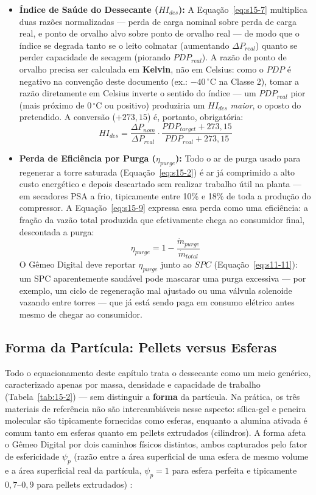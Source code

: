 \documentclass[12pt,a4paper]{article}
\numberwithin{equation}{section}
\numberwithin{table}{section}
\numberwithin{figure}{section}
\begin{document}
{\begin{itemize}
			\item \textbf{Índice de Saúde do Dessecante ($HI_{des}$):} A Equação~\eqref{eq:s15-7} multiplica duas razões normalizadas — perda de carga nominal sobre perda de carga real, e ponto de orvalho alvo sobre ponto de orvalho real — de modo que o índice se degrada tanto se o leito colmatar (aumentando $\Delta P_{real}$) quanto se perder capacidade de secagem (piorando $PDP_{real}$). A razão de ponto de orvalho precisa ser calculada em \textbf{Kelvin}, não em Celsius: como o $PDP$ é negativo na convenção deste documento (ex.: $-40\,^{\circ}$C na Classe 2), tomar a razão diretamente em Celsius inverte o sentido do índice — um $PDP_{real}$ pior (mais próximo de $0\,^{\circ}$C ou positivo) produziria um $HI_{des}$ \textit{maior}, o oposto do pretendido. A conversão ($+273{,}15$) é, portanto, obrigatória:
			\begin{equation}\label{eq:s15-7}
HI_{des} = \frac{\Delta P_{nom}}{\Delta P_{real}} \cdot \frac{PDP_{target} + 273{,}15}{PDP_{real} + 273{,}15}
\end{equation}

			\item \textbf{Perda de Eficiência por Purga ($\eta_{purge}$):} Todo o ar de purga usado para regenerar a torre saturada (Equação~\eqref{eq:s15-2}) é ar já comprimido a alto custo energético e depois descartado sem realizar trabalho útil na planta — em secadores PSA a frio, tipicamente entre 10\% e 18\% de toda a produção do compressor. A Equação~\eqref{eq:s15-9} expressa essa perda como uma eficiência: a fração da vazão total produzida que efetivamente chega ao consumidor final, descontada a purga:
			\begin{equation}\label{eq:s15-9}
\eta_{purge} = 1 - \frac{\dot{m}_{purge}}{\dot{m}_{total}}
\end{equation}
			O Gêmeo Digital deve reportar $\eta_{purge}$ junto ao $SPC$ (Equação~\eqref{eq:s11-11}): um SPC aparentemente saudável pode mascarar uma purga excessiva — por exemplo, um ciclo de regeneração mal ajustado ou uma válvula solenoide vazando entre torres — que já está sendo paga em consumo elétrico antes mesmo de chegar ao consumidor.
		\end{itemize}

		\subsection{\textbf{Forma da Partícula: Pellets versus Esferas}}
		Todo o equacionamento deste capítulo trata o dessecante como um meio genérico, caracterizado apenas por massa, densidade e capacidade de trabalho (Tabela~\ref{tab:15-2}) — sem distinguir a \textbf{forma} da partícula. Na prática, os três materiais de referência não são intercambiáveis nesse aspecto: sílica-gel e peneira molecular são tipicamente fornecidas como esferas, enquanto a alumina ativada é comum tanto em esferas quanto em pellets extrudados (cilindros). A forma afeta o Gêmeo Digital por dois caminhos físicos distintos, ambos capturados pelo fator de esfericidade $\psi_p$ (razão entre a área superficial de uma esfera de mesmo volume e a área superficial real da partícula, $\psi_p = 1$ para esfera perfeita e tipicamente $0{,}7$--$0{,}9$ para pellets extrudados) \cite{ergun}:

}
\end{document}
